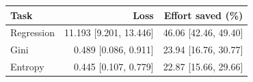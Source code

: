 \begin{tabular}{@{}lrr@{}}
\toprule
Task & Loss & Effort saved (\%) \\
\midrule
Regression & 11.193 [9.201, 13.446] & 46.06 [42.46, 49.40] \\
Gini & 0.489 [0.086, 0.911] & 23.94 [16.76, 30.77] \\
Entropy & 0.445 [0.107, 0.779] & 22.87 [15.66, 29.66] \\
\bottomrule
\end{tabular}
